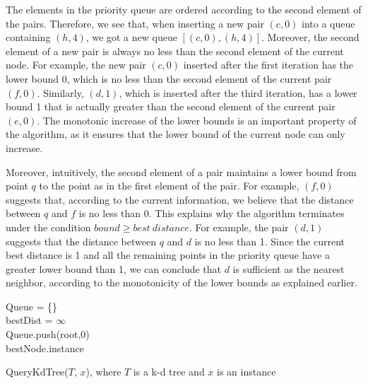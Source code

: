 The elements in the priority queue are ordered according to the second element of the pairs. Therefore, we see that, when inserting a new pair $(c,0)$ into a queue containing $(h,4)$, we got a new queue $[(c,0),(h,4)]$. Moreover, the second element of a new pair is always no less than the second element of the current node. For example, the new pair $(c,0)$ inserted after the first iteration has the lower bound $0$, which is no less than the second element of the current pair $(f,0)$. Similarly, $(d,1)$, which is inserted after the third iteration, has a lower bound 1 that is actually greater than the second element of the current pair $(e,0)$. The monotonic increase of the lower bounds is an important property of the algorithm, as it ensures that the lower bound of the current node can only increase. %


Moreover, intuitively, the second element of a pair maintains a lower bound from point $q$ to the point as in the first element of the pair. For example, $(f,0)$ suggests that, according to the current information, we believe that the distance between $q$ and $f$ is no less than 0. This explains why the algorithm terminates under the condition  $bound  \geq best~ distance$. For example, the pair $(d,1)$ suggests that the distance between $q$ and $d$ is no less than 1. Since the current best distance is 1 and all the remaining points in the priority queue have a greater lower bound than 1, we can conclude that $d$ is sufficient as the nearest neighbor, according to the monotonicity of the lower bounds as explained earlier. 

\begin{algorithm}[!htbp]
\SetAlgoLined

Queue = \{\}\\
bestDist = $\infty$ \\
Queue.push(root,0) \\
\Return bestNode.instance

 \caption{QueryKdTree($T$, $x$), where $T$ is a k-d tree and $x$ is an instance}
 \label{alg:SpeedUpKNN}
\end{algorithm}





